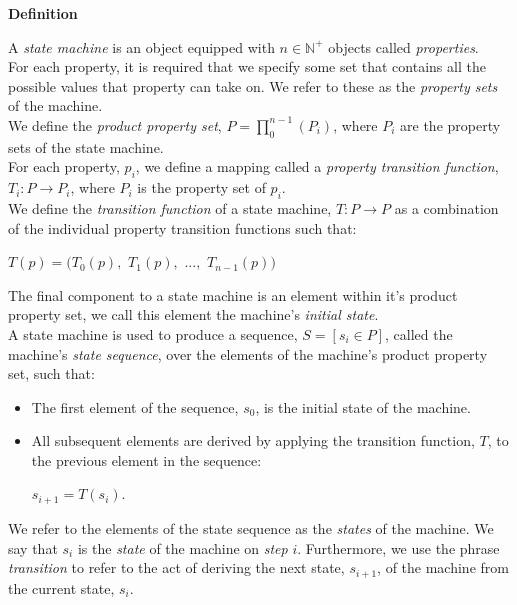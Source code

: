 \documentclass[a4paper,12pt]{article}
\begin{document}
\label{definition:state_machine}
\hypertarget{definition:state_machine}{}
\begin{tcolorbox}
\textbf{Definition}

\noindent A \textit{state machine} is an object equipped with $n \in \mathbb{N^+}$ objects called \textit{properties}.\\

\noindent For each property, it is required that we specify some set that contains all the possible values that property can take on. We refer to these as the \textit{property sets} of the machine.\\

\noindent We define the \textit{product property set}, $P = \prod^{n-1}_0{(P_i)}$, where $P_i$ are the property sets of the state machine.\\

\noindent For each property, $p_i$, we define a mapping called a \textit{property transition function}, $T_i: P \rightarrow P_i$, where $P_i$ is the property set of $p_i$.\\

\noindent We define the \textit{transition function} of a state machine, $T: P \rightarrow P$ as a combination of the individual property transition functions such that:
\begin{center}
$T(p) = (T_0(p),$ $T_1(p),$ $...,$ $T_{n-1}(p))$
\end{center}

\noindent The final component to a state machine is an element within it's product property set, we call this element the machine's \textit{initial state}.\\

\noindent A state machine is used to produce a sequence, $S = [s_i \in P]$, called the machine's \textit{state sequence}, over the elements of the machine's product property set, such that:
\begin{itemize}
\item The first element of the sequence, $s_0$, is the initial state of the machine.

\item All subsequent elements are derived by applying the transition function, $T$, to the previous element in the sequence: 
\begin{center}
$s_{i + 1} = T(s_i)$.
\end{center}

\end{itemize}

\noindent We refer to the elements of the state sequence as the \textit{states} of the machine. We say that $s_i$ is the \textit{state} of the machine on \textit{step} $i$. Furthermore, we use the phrase \textit{transition} to refer to the act of deriving the next state, $s_{i+1}$, of the machine from the current state, $s_i$.

\end{tcolorbox}
\end{document}
